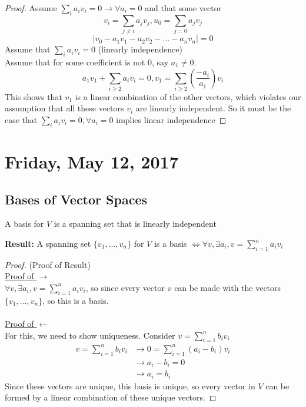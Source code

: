 \documentclass[12pt]{article}
\begin{document}
\begin{proof}
	Assume $\sum_i a_i v_i = 0 \longrightarrow \forall a_i = 0$ and that some vector
	$$v_i = \sum_{j \neq i} a_j v_j, u_0 = \sum_{j = 0} a_j v_j$$
	$$|v_0 - a_1 v_1 - a_2 v_2 - ... - a_n v_n| = 0$$
	Assume that $\sum_i a_i v_i = 0$ (linearly independence)\\
	Assume that for some coefficient is not 0, say $a_1 \neq 0$.\\
	$$a_1 v_1 + \sum_{i\geq 2} a_i v_i = 0, v_1 = \sum_{i\geq 2} (\frac{-a_i}{a_1}) v_i$$
	This shows that $v_1$ is a linear combination of the other vectors, which violates our assumption that all these vectors $v_i$ are linearly independent. So it must be the case that $\sum_i a_i v_i = 0, \forall a_i = 0$ implies linear independence
\end{proof}

\newpage

\section{Friday, May 12, 2017}

\subsection{Bases of Vector Spaces}

\begin{tcolorbox}[title=Definition: A Basis of Vector Spaces]
	A basis for $V$ is a spanning set that is linearly independent
\end{tcolorbox}

\textbf{Result:} A spanning set $\{v_1, ..., v_n \}$ for $V$ is a basis $\Longleftrightarrow \forall v, \exists a_i, v = \sum^n_{i = 1} a_i v_i$

\begin{proof}(Proof of Result)\\
	\underline{Proof of $\longrightarrow$}\\
	$\forall v, \exists a_i, v = \sum^n_{i = 1} a_i v_i$, so since every vector $v$ can be made with the vectors $\{v_1, ..., v_n \}$, so this is a basis.\\
	\\
	\underline{Proof of $\longleftarrow$}\\
	For this, we need to show uniqueness. Consider $v = \sum^n_{i = 1} b_i v_i$
	\begin{align*}
		v = \sum^n_{i = 1} b_i v_i & \longrightarrow 0 = \sum^n_{i = 1} (a_i - b_i) v_i\\
		& \longrightarrow a_i - b_i = 0\\
		& \longrightarrow a_i = b_i
	\end{align*}
	Since these vectors are unique, this basis is unique, so every vector in $V$ can be formed by a linear combination of these unique vectors.
\end{proof}
\end{document}
